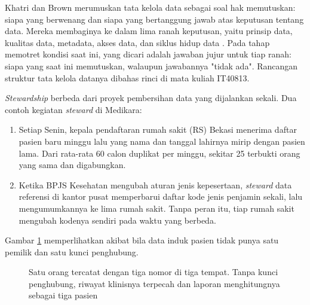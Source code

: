 Khatri dan Brown merumuskan tata kelola data sebagai soal hak memutuskan:
siapa yang berwenang dan siapa yang bertanggung jawab atas keputusan tentang
data. Mereka membaginya ke dalam lima ranah keputusan, yaitu prinsip data,
kualitas data, metadata, akses data, dan siklus hidup data
\cite{c06-khatri2010}. Pada tahap memotret kondisi saat ini, yang dicari adalah
jawaban jujur untuk tiap ranah: siapa yang saat ini memutuskan, walaupun
jawabannya "tidak ada". Rancangan struktur tata kelola datanya dibahas rinci di
mata kuliah IT40813.

\textit{Stewardship} berbeda dari proyek pembersihan data yang dijalankan
sekali. Dua contoh kegiatan \textit{steward} di Medikara:

\begin{enumerate}
  \item Setiap Senin, kepala pendaftaran rumah sakit (RS) Bekasi menerima
        daftar pasien baru
        minggu lalu yang nama dan tanggal lahirnya mirip dengan pasien lama.
        Dari rata-rata 60 calon duplikat per minggu, sekitar 25 terbukti orang
        yang sama dan digabungkan.
  \item Ketika BPJS Kesehatan mengubah aturan jenis kepesertaan,
        \textit{steward} data referensi di kantor pusat memperbarui daftar kode jenis penjamin
        sekali, lalu mengumumkannya ke lima rumah sakit. Tanpa peran itu, tiap
        rumah sakit mengubah kodenya sendiri pada waktu yang berbeda.
\end{enumerate}

Gambar \ref{fig:ch06-identitas-ganda} memperlihatkan akibat bila data induk
pasien tidak punya satu pemilik dan satu kunci penghubung.

\begin{figure}[!htb]
  \centering
  
  \caption{Satu orang tercatat dengan tiga nomor di tiga tempat. Tanpa kunci
           penghubung, riwayat klinisnya terpecah dan laporan menghitungnya
           sebagai tiga pasien}
  \label{fig:ch06-identitas-ganda}
\end{figure}

